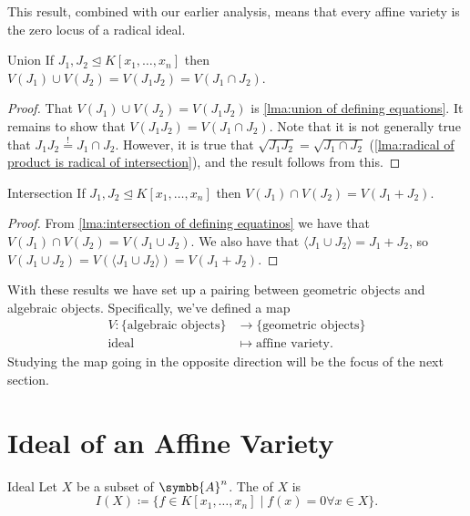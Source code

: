 \documentclass[fleqn]{NotesClass}
\newcommand{\subideal}{\trianglelefteq}
\newcommand{\affine}{\symbb{A}}
\begin{document}
    This result, combined with our earlier analysis, means that every affine variety is the zero locus of a radical ideal.
    
    \begin{lma}{Union}{}
        If \(J_1, J_2 \subideal K[x_1, \dotsc, x_n]\) then \(V(J_1) \cup V(J_2) = V(J_1 J_2) = V(J_1 \cap J_2)\).
        \begin{proof}
            That \(V(J_1) \cup V(J_2) = V(J_1 J_2)\) is \cref{lma:union of defining equations}.
            It remains to show that \(V(J_1 J_2) = V(J_1 \cap J_2)\).
            Note that it is not generally true that \(J_1 J_2 \stackrel{!}{=} J_1 \cap J_2\).
            However, it is true that \(\sqrt{J_1J_2} = \sqrt{J_1 \cap J_2}\) (\cref{lma:radical of product is radical of intersection}), and the result follows from this.
        \end{proof}
    \end{lma}
    
    \begin{lma}{Intersection}{}
        If \(J_1, J_2 \subideal K[x_1, \dotsc, x_n]\) then \(V(J_1) \cap V(J_2) = V(J_1 + J_2)\).
        \begin{proof}
            From \cref{lma:intersection of defining equatinos} we have that \(V(J_1) \cap V(J_2) = V(J_1 \cup J_2)\).
            We also have that \(\langle J_1 \cup J_2 \rangle = J_1 + J_2\), so \(V(J_1 \cup J_2) = V(\langle J_1 \cup J_2 \rangle) = V(J_1 + J_2)\).
        \end{proof}
    \end{lma}
    
    \begin{remark}{}{}
        With these results we have set up a pairing between geometric objects and algebraic objects.
        Specifically, we've defined a map
        \begin{align}
            V \colon \{\text{algebraic objects}\} &\to \{\text{geometric objects}\}\\
            \text{ideal} &\mapsto \text{affine variety}.
        \end{align}
        Studying the map going in the opposite direction will be the focus of the next section.
    \end{remark}
    
    \section{Ideal of an Affine Variety}
    \begin{dfn}{Ideal}{}
        Let \(X\) be a subset of \(\affine^n\).
        The  of \(X\) is
        \begin{equation}
            I(X) \coloneq \{f \in K[x_1, \dotsc, x_n] \mid f(x) = 0 \forall x \in X\}.
        \end{equation}
    \end{dfn}
    
\end{document}
